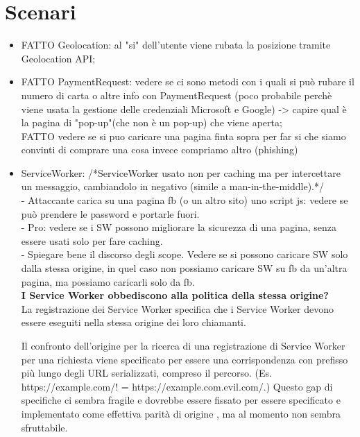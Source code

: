 \documentclass[italian]{article}
\begin{document}
\section{Scenari}
\begin{itemize}
\item FATTO Geolocation: al "si" dell'utente viene rubata la posizione tramite Geolocation API;
\\
\item FATTO PaymentRequest: vedere se ci sono metodi con i quali si può rubare il numero di carta o altre info con PaymentRequest (poco probabile perchè viene usata la gestione delle credenziali Microsoft e Google) -> capire qual è la pagina di "pop-up"(che non è un pop-up) che viene aperta;
\\
FATTO vedere se si puo caricare una pagina finta sopra per far si che siamo convinti di comprare una cosa invece compriamo altro (phishing)
\\
\item ServiceWorker: /*ServiceWorker usato non per caching ma per intercettare un messaggio, cambiandolo in negativo (simile a man-in-the-middle).*/
\\
- Attaccante carica su una pagina fb (o un altro sito) uno script js: vedere se può prendere le password e portarle fuori.
\\
- Pro: vedere se i SW possono migliorare la sicurezza di una pagina, senza essere usati solo per fare caching.
\\
- Spiegare bene il discorso degli scope.
Vedere se si possono caricare SW solo dalla stessa origine, in quel caso non possiamo caricare SW su fb da un'altra pagina, ma possiamo caricarli solo da fb.
\\
\textbf{I Service Worker obbediscono alla politica della stessa origine?}
\\
La registrazione dei Service Worker specifica che i Service Worker devono essere eseguiti nella stessa origine dei loro chiamanti.

Il confronto dell'origine per la ricerca di una registrazione di Service Worker per una richiesta viene specificato per essere una corrispondenza con prefisso più lungo degli URL serializzati, compreso il percorso. (Es. https://example.com/! = https://example.com.evil.com/.) 
Questo gap di specifiche ci sembra fragile e dovrebbe essere fissato per essere specificato e implementato come effettiva parità di origine , ma al momento non sembra sfruttabile.


\end{itemize}
\end{document}
